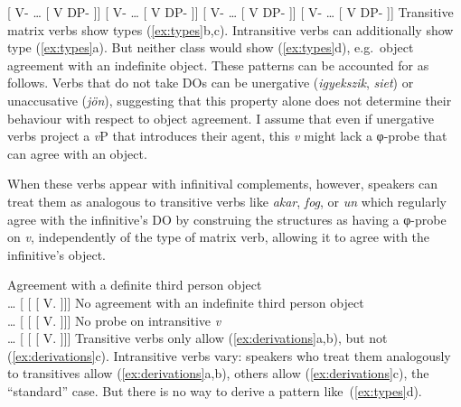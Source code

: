 \pex\label{ex:types} \a 	{}[ V-\Sbj{} \dots{} [\tss{\Inf} V DP-\Def{}
]]\trailingcitation{\faCheck} \a 	{}[ V-\Obj{} \dots{} [\tss{\Inf} V
DP-\Def{} ]]\trailingcitation{\faCheck} \a 	{}[ V-\Sbj{} \dots{} [\tss{\Inf} V
DP-\Indef{} ]]\trailingcitation{\faCheck} \a 	{}[ V-\Obj{} \dots{}
[\tss{\Inf} V DP-\Indef{} ]]\trailingcitation{\faTimes} \xe Transitive matrix
verbs show types (\ref{ex:types}b,c). Intransitive verbs can additionally show
type (\ref{ex:types}a). But neither class would show (\ref{ex:types}d), e.g.\
object agreement with an indefinite object.
%
These patterns can be accounted for as follows. Verbs that do not take \Acc{}
\glspl{DO} can be unergative (\emph{igyekszik}, \emph{siet}) or unaccusative
(\emph{jön}), suggesting that this property alone does not determine their
behaviour with respect to object agreement. I assume that even if unergative
verbs project a \emph{v}P that introduces their agent, this \emph{v} might lack
a φ-probe that can agree with an \Acc{} object.

When these verbs appear with infinitival complements, however, speakers can
treat them as analogous to transitive verbs like \emph{akar}, \emph{fog}, or
\emph{un} which regularly agree with the infinitive's \gls{DO} by construing
the structures as having a φ-probe on \emph{v}, independently of the type of
matrix verb, allowing it to agree with the infinitive's object.

\pex[interpartskip=6ex]\label{ex:derivations}
    \a  Agreement with a definite third person object\\
        \dots{} [  [ [ V.\Inf{}  ]]]
        \td{v}{dp}{\faCheck{} Agree}
    \a  No agreement with an indefinite third person object\\
        \dots{} [  [ [ V.\Inf{}  ]]]
        \tx{v}{dp}{\faTimes{} Agree}
    \a  No probe on intransitive \emph{v}\\
        \dots{} [  [ [ V.\Inf{}  ]]]
\xe
Transitive verbs only allow (\ref{ex:derivations}a,b), but not
(\ref{ex:derivations}c). Intransitive verbs vary: speakers who treat them
analogously to transitives allow (\ref{ex:derivations}a,b), others allow
(\ref{ex:derivations}c), the \enquote{standard} case. But there is no way to
derive a pattern like~(\ref{ex:types}d).

